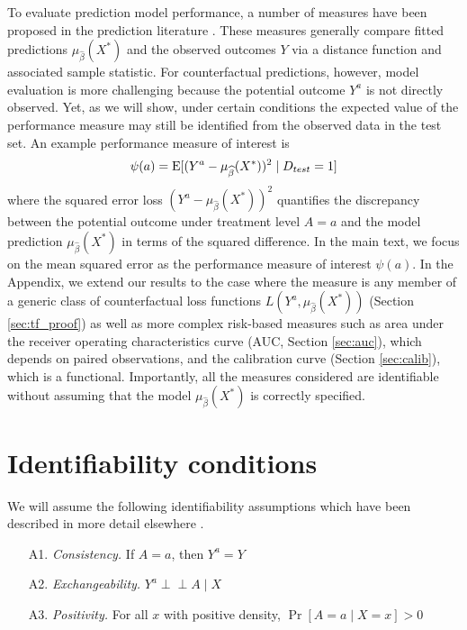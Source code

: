 To evaluate prediction model performance, a number of measures have been proposed in the prediction literature \cite{harrell_multivariable_1996, altman_what_2000, steyerberg_clinical_2019}. These measures generally compare fitted predictions $\mu_{\widehat{\beta}}(X^*)$ and the observed outcomes $Y$ via a distance function and associated sample statistic. For counterfactual predictions, however, model evaluation is more challenging because the potential outcome $Y^a$ is not directly observed. Yet, as we will show, under certain conditions the expected value of the performance measure may still be identified from the observed data in the test set. An example performance measure of interest is 
\begin{equation*}
    \psi(a) = \operatorname{E}[(Y^a - \mu_{\widehat{\beta}}(X^*))^2 \mid D_{test} = 1]
\end{equation*}
where the squared error loss $(Y^a - \mu_{\widehat{\beta}}(X^*))^2$ quantifies the discrepancy between the potential outcome under treatment level $A = a$ and the model prediction $\mu_{\widehat{\beta}}(X^*)$ in terms of the squared difference. In the main text, we focus on the mean squared error as the performance measure of interest $\psi(a)$. In the Appendix, we extend our results to the case where the measure is any member of a generic class of counterfactual loss functions $L(Y^a,  \mu_{\widehat{\beta}}(X^*))$ (Section \ref{sec:tf_proof}) as well as more complex risk-based measures such as area under the receiver operating characteristics curve (AUC, Section \ref{sec:auc}), which depends on paired observations, and the calibration curve (Section \ref{sec:calib}), which is a functional. Importantly, all the measures considered are identifiable without assuming that the model $\mu_{\widehat{\beta}}(X^*)$ is correctly specified.

\section{Identifiability conditions} \label{sec:identifiability}
We will assume the following identifiability assumptions which have been described in more detail elsewhere \cite{hernan_causal_2020, robins_new_1986, robins_graphical_1987}.

\begin{enumerate}
    \item[A1.] \textit{Consistency.} If $A = a$, then $Y^a = Y$ 
    \item[A2.] \textit{Exchangeability.} $Y^a \perp\!\!\!\perp A \mid X$ 
    \item[A3.] \textit{Positivity.} For all $x$ with positive density, $\Pr[A = a \mid X = x] > 0$ 
\end{enumerate}

